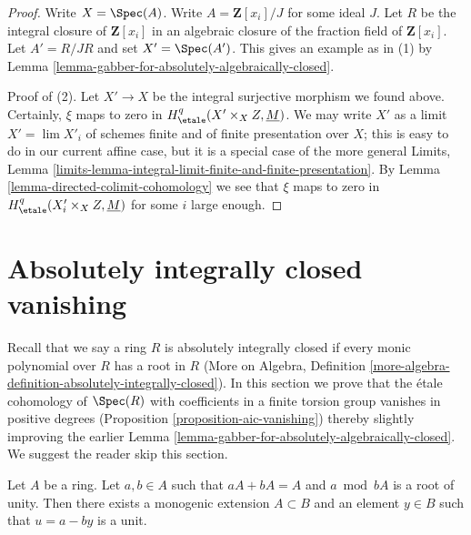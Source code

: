\begin{proof}
Write $X = \Spec(A)$. Write $A = \mathbf{Z}[x_i]/J$ for some ideal $J$.
Let $R$ be the integral closure of $\mathbf{Z}[x_i]$ in an algebraic
closure of the fraction field of $\mathbf{Z}[x_i]$. Let
$A' = R/JR$ and set $X' = \Spec(A')$. This gives an example as in (1) by
Lemma \ref{lemma-gabber-for-absolutely-algebraically-closed}.

\medskip\noindent
Proof of (2). Let $X' \to X$ be the integral surjective morphism we found
above. Certainly, $\xi$ maps to zero in
$H^q_\etale(X' \times_X Z, \underline{M})$. We may write $X'$ as a
limit $X' = \lim X'_i$ of schemes finite and of finite presentation
over $X$; this is easy to do in our current affine case, but it
is a special case of the more general Limits, Lemma
\ref{limits-lemma-integral-limit-finite-and-finite-presentation}.
By Lemma \ref{lemma-directed-colimit-cohomology}
we see that $\xi$ maps to zero in $H^q_\etale(X'_i \times_X Z, \underline{M})$
for some $i$ large enough.
\end{proof}








\section{Absolutely integrally closed vanishing}
\label{section-aic-vanishing}

\noindent
Recall that we say a ring $R$ is absolutely integrally closed
if every monic polynomial over $R$ has a root in $R$
(More on Algebra, Definition
\ref{more-algebra-definition-absolutely-integrally-closed}).
In this section we prove that the \'etale cohomology of
$\Spec(R)$ with coefficients in a finite torsion group
vanishes in positive degrees (Proposition \ref{proposition-aic-vanishing})
thereby slightly improving the earlier
Lemma \ref{lemma-gabber-for-absolutely-algebraically-closed}.
We suggest the reader skip this section.

\begin{lemma}
\label{lemma-find-extension}
Let $A$ be a ring. Let $a, b \in A$ such that
$aA + bA = A$ and $a \bmod bA$ is a root of unity.
Then there exists a monogenic extension $A \subset B$
and an element $y \in B$ such that $u = a - by$ is a unit.
\end{lemma}

